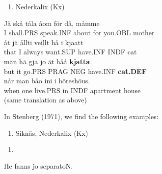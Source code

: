 \begin{enumerate} %
\item 
Nederkalix (Kx)

\end{enumerate} %
\ea\label{}
\gll Jä  skå  tåla  åom  för  dä,  måmme\\


I  shall.PRS  speak.INF  about  for  you.OBL  mother\\ %


\ea\label{}
\gll åt  jä  ållti  veillt  hå  i  kjaatt\\


that  I  always  want.SUP  have.INF  INDF  cat  \\ %


\ea\label{}
\gll män  hä  gja  jo  ät  håå  \textbf{kjatta}\\


but  it  go.PRS  PRAG  NEG  have.INF  \textbf{cat.DEF}\\ %


\ea\label{}
\gll når  man  båo   ini  i  höreshöus.\\


when  one  live.PRS  in  INDF  apartment house\\ %


(same translation as above)
\z


In Stenberg (1971), we find the following examples:

\begin{enumerate} %
\item 
Siknäs, Nederkalix (Kx)

\end{enumerate} %
\setcounter{listLFOxcviiileveli}{0}
\begin{enumerate} %
\item 
\end{enumerate} %
He  fanns  jo  separatoN.\\


